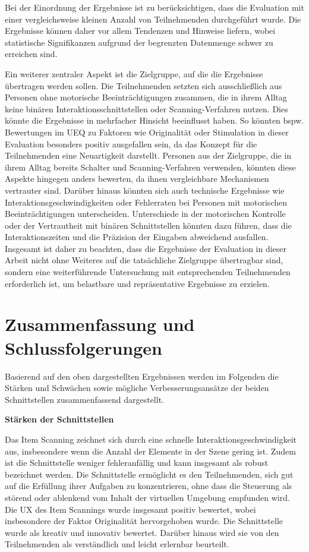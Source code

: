 Bei der Einordnung der Ergebnisse ist zu berücksichtigen, dass die Evaluation mit einer vergleichsweise kleinen Anzahl von Teilnehmenden durchgeführt wurde. Die Ergebnisse können daher vor allem Tendenzen und Hinweise liefern, wobei statistische Signifikanzen aufgrund der begrenzten Datenmenge schwer zu erreichen sind.

Ein weiterer zentraler Aspekt ist die Zielgruppe, auf die die Ergebnisse übertragen werden sollen. Die Teilnehmenden setzten sich ausschließlich aus Personen ohne motorische Beeinträchtigungen zusammen, die in ihrem Alltag keine binären Interaktionsschnittstellen oder Scanning-Verfahren nutzen. Dies könnte die Ergebnisse in mehrfacher Hinsicht beeinflusst haben. So könnten bspw. Bewertungen im UEQ zu Faktoren wie Originalität oder Stimulation in dieser Evaluation besonders positiv ausgefallen sein, da das Konzept für die Teilnehmenden eine Neuartigkeit darstellt. Personen aus der Zielgruppe, die in ihrem Alltag bereits Schalter und Scanning-Verfahren verwenden, könnten diese Aspekte hingegen anders bewerten, da ihnen vergleichbare Mechanismen vertrauter sind.
Darüber hinaus könnten sich auch technische Ergebnisse wie Interaktionsgeschwindigkeiten oder Fehlerraten bei Personen mit motorischen Beeinträchtigungen unterscheiden. Unterschiede in der motorischen Kontrolle oder der Vertrautheit mit binären Schnittstellen könnten dazu führen, dass die Interaktionszeiten und die Präzision der Eingaben abweichend ausfallen. Insgesamt ist daher zu beachten, dass die Ergebnisse der Evaluation in dieser Arbeit nicht ohne Weiteres auf die tatsächliche Zielgruppe übertragbar sind, sondern eine weiterführende Untersuchung mit entsprechenden Teilnehmenden erforderlich ist, um belastbare und repräsentative Ergebnisse zu erzielen.

\section{Zusammenfassung und Schlussfolgerungen}

Basierend auf den oben dargestellten Ergebnissen werden im Folgenden die Stärken und Schwächen sowie mögliche Verbesserungsansätze der beiden Schnittstellen zusammenfassend dargestellt.

\textbf{Stärken der Schnittstellen}

Das Item Scanning zeichnet sich durch eine schnelle Interaktionsgeschwindigkeit aus, insbesondere wenn die Anzahl der Elemente in der Szene gering ist. Zudem ist die Schnittstelle weniger fehleranfällig und kann insgesamt als robust bezeichnet werden. Die Schnittstelle ermöglicht es den Teilnehmenden, sich gut auf die Erfüllung ihrer Aufgaben zu konzentrieren, ohne dass die Steuerung als störend oder ablenkend vom Inhalt der virtuellen Umgebung empfunden wird. Die UX des Item Scannings wurde insgesamt positiv bewertet, wobei insbesondere der Faktor Originalität hervorgehoben wurde. Die Schnittstelle wurde als kreativ und innovativ bewertet. Darüber hinaus wird sie von den Teilnehmenden als verständlich und leicht erlernbar beurteilt. 

